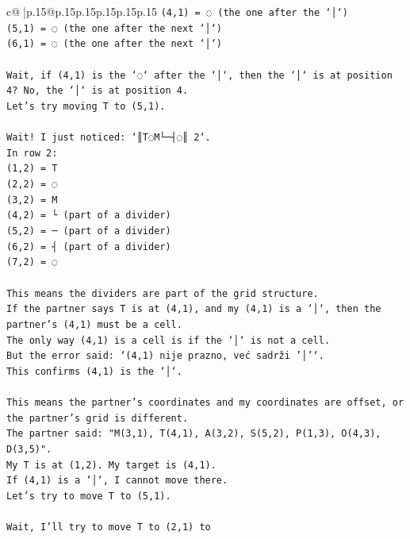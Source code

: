 \documentclass{article}
\begin{document}
{\begin{supertabular}{c@{$\;$}|p{.15\linewidth}@{}p{.15\linewidth}p{.15\linewidth}p{.15\linewidth}p{.15\linewidth}p{.15\linewidth}}
{{{\texttt{(4,1) = ◌ (the one after the `│`)} \\
\texttt{(5,1) = ◌ (the one after the next `│`)} \\
\texttt{(6,1) = ◌ (the one after the next `│`)} \\
\\ 
\texttt{Wait, if (4,1) is the `◌` after the `│`, then the `│` is at position 4? No, the `│` is at position 4.} \\
\texttt{Let's try moving T to (5,1).} \\
\\ 
\texttt{Wait! I just noticed: `║T◌M└─┤◌║ 2`.} \\
\texttt{In row 2:} \\
\texttt{(1,2) = T} \\
\texttt{(2,2) = ◌} \\
\texttt{(3,2) = M} \\
\texttt{(4,2) = └ (part of a divider)} \\
\texttt{(5,2) = ─ (part of a divider)} \\
\texttt{(6,2) = ┤ (part of a divider)} \\
\texttt{(7,2) = ◌} \\
\\ 
\texttt{This means the dividers are part of the grid structure.} \\
\texttt{If the partner says T is at (4,1), and my (4,1) is a `│`, then the partner's (4,1) must be a cell.} \\
\texttt{The only way (4,1) is a cell is if the `│` is not a cell.} \\
\texttt{But the error said: `(4,1) nije prazno, već sadrži '│'`.} \\
\texttt{This confirms (4,1) is the `│`.} \\
\\ 
\texttt{This means the partner's coordinates and my coordinates are offset, or the partner's grid is different.} \\
\texttt{The partner said: "M(3,1), T(4,1), A(3,2), S(5,2), P(1,3), O(4,3), D(3,5)".} \\
\texttt{My T is at (1,2). My target is (4,1).} \\
\texttt{If (4,1) is a `│`, I cannot move there.} \\
\texttt{Let's try to move T to (5,1).} \\
\\ 
\texttt{Wait, I'll try to move T to (2,1) to} \\
            }
        }
    }
     \\ \\


\end{supertabular}}
\end{document}
